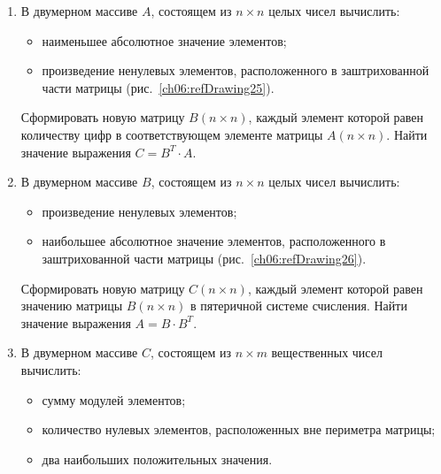 \begin{enumerate}


\item В двумерном массиве $A$, состоящем из $n\times n$ целых чисел вычислить:

\begin{itemize}
\item наименьшее абсолютное значение элементов;
\item произведение ненулевых элементов, расположенного в заштрихованной части матрицы (рис.~\ref{ch06:refDrawing25}).
\end{itemize}

Сформировать новую матрицу $B(n\times n)$, каждый элемент которой равен количеству цифр
в соответствующем элементе матрицы $A(n\times n)$. Найти
значение выражения  $C=B^T\cdot A$.



\item В двумерном массиве $B$, состоящем из $n\times n$ целых чисел вычислить:

\begin{itemize}
\item произведение ненулевых элементов;
\item наибольшее абсолютное значение элементов, расположенного в заштрихованной 
части матрицы (рис.~\ref{ch06:refDrawing26}).
\end{itemize}

Сформировать новую матрицу $C(n\times n)$, каждый элемент которой равен значению матрицы
$B(n\times n)$ в пятеричной системе счисления. Найти
значение выражения  $A=B\cdot B^T$.



\item В двумерном массиве $C$, состоящем из $n\times m$ вещественных чисел вычислить:

\begin{itemize}
\item сумму модулей элементов;
\item количество нулевых элементов, расположенных вне периметра матрицы;
\item два наибольших положительных значения.
\end{itemize}


\end{enumerate}
